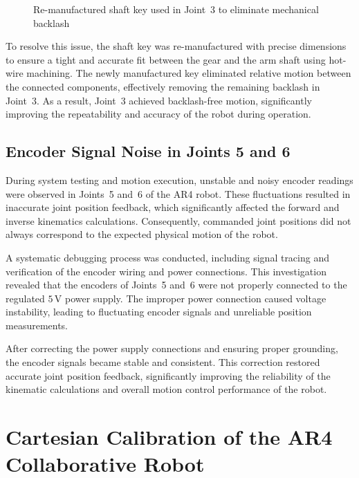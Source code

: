 \begin{figure}[H]
    \centering
    \caption{Re-manufactured shaft key used in Joint~3 to eliminate mechanical backlash}
    \label{fig:shaft_key}
\end{figure}

To resolve this issue, the shaft key was re-manufactured with 
precise dimensions to ensure a tight and accurate fit between 
the gear and the arm shaft using hot-wire machining. The newly manufactured key eliminated 
relative motion between the connected components, effectively 
removing the remaining backlash in Joint~3. As a result, 
Joint~3 achieved backlash-free motion, significantly improving 
the repeatability and accuracy of the robot during operation.

\subsection{Encoder Signal Noise in Joints 5 and 6}

During system testing and motion execution, unstable and noisy encoder readings were observed in Joints~5 and~6 of the AR4 robot. These fluctuations resulted in inaccurate joint position feedback, which significantly affected the forward and inverse kinematics calculations. Consequently, commanded joint positions did not always correspond to the expected physical motion of the robot.

A systematic debugging process was conducted, including signal tracing and verification of the encoder wiring and power connections. This investigation revealed that the encoders of Joints~5 and~6 were not properly connected to the regulated $5\,\text{V}$ power supply. The improper power connection caused voltage instability, leading to fluctuating encoder signals and unreliable position measurements.

After correcting the power supply connections and ensuring proper grounding, the encoder signals became stable and consistent. This correction restored accurate joint position feedback, significantly improving the reliability of the kinematic calculations and overall motion control performance of the robot.


\section{Cartesian Calibration of the AR4 Collaborative Robot}

